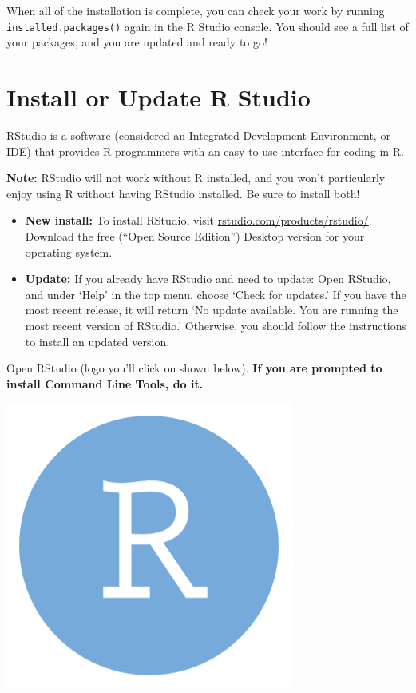 \documentclass[
]{book}
\begin{document}
When all of the installation is complete, you can check your work by running \texttt{installed.packages()} again in the R Studio console. You should see a full list of your packages, and you are updated and ready to go!

\hypertarget{install-or-update-r-studio}{%
\section{Install or Update R Studio}\label{install-or-update-r-studio}}

RStudio is a software (considered an Integrated Development Environment, or IDE) that provides R programmers with an easy-to-use interface for coding in R.

\textbf{Note:} RStudio will not work without R installed, and you won't particularly enjoy using R without having RStudio installed. Be sure to install both!

\begin{itemize}
\item
  \textbf{New install:} To install RStudio, visit \href{https://www.rstudio.com/products/rstudio/}{rstudio.com/products/rstudio/}. Download the free (``Open Source Edition'') Desktop version for your operating system.
\item
  \textbf{Update:} If you already have RStudio and need to update: Open RStudio, and under `Help' in the top menu, choose `Check for updates.' If you have the most recent release, it will return `No update available. You are running the most recent version of RStudio.' Otherwise, you should follow the instructions to install an updated version.
\end{itemize}

Open RStudio (logo you'll click on shown below). \textbf{If you are prompted to install Command Line Tools, do it.}

\begin{center}\includegraphics[width=0.5\linewidth]{images/rstudio} \end{center}
\end{document}
